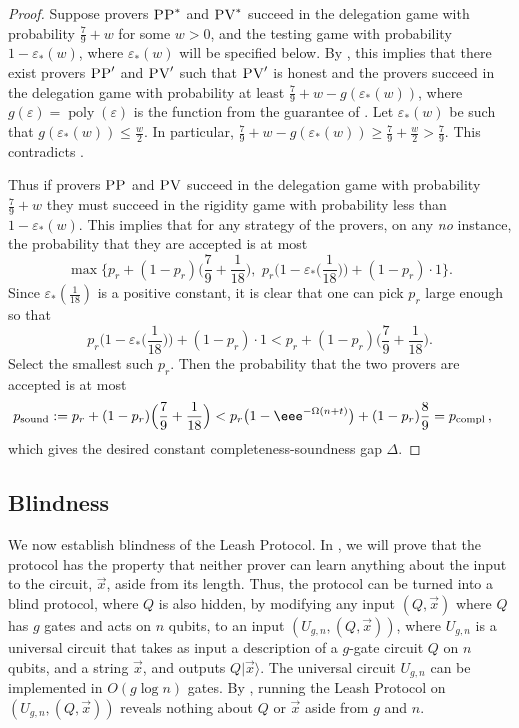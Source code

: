 \documentclass{toc}
\newcommand{\ket}[1]{|#1\rangle}
\DeclareMathOperator{\poly}{poly}
\DeclareMathOperator{\sound}{sound}
\DeclareMathOperator{\compl}{compl}
\newcommand{\eps}{\varepsilon}
\newcommand{\pv}{\textsc{PV}}
\newcommand{\pp}{\textsc{PP}}
\begin{document}
\begin{proof}
Suppose provers $\pp^*$ and $\pv^*$ succeed in the delegation game with probability $\frac79+w$ for some $w>0$, and the testing game with probability $1-\eps_*(w)$, where $\eps_*(w)$ will be specified below. By , this implies that there exist provers $\pp'$ and $\pv'$ such that $\pv'$ is honest and the provers succeed in the delegation game with probability at least $\frac79+w-g(\eps_*(w))$, where $g(\eps) = \poly(\eps)$ is the function from the guarantee of . Let $\eps_*(w)$ be such that $g(\eps_*(w)) \leq \frac{w}{2}$. In particular, $\frac79+w-g(\eps_*(w)) \geq \frac79+\frac{w}{2}>\frac79$. This contradicts . 

Thus if provers $\pp$ and $\pv$ succeed in the delegation game with probability $\frac79+w$ they must succeed in the rigidity game with probability less than $1-\eps_*(w)$. 
This implies that for any strategy of the provers, on any \textit{no} instance, the probability that they are accepted is at most
\begin{equation}
\max\Big\{p_r+(1-p_r)\Big(\frac79+\frac{1}{18}\Big),\,\, p_r\Big(1-\eps_*\Big(\frac{1}{18}\Big)\Big)+(1-p_r)\cdot 1\Big\}.
\end{equation}
Since $\eps_*(\frac{1}{18})$ is a positive constant, it is clear that one can pick $p_r$ large enough so that 
\begin{equation}
p_r\Big(1-\eps_*\Big(\frac{1}{18}\Big)\Big)+(1-p_r)\cdot 1 < p_r+(1-p_r)\Big(\frac79+\frac{1}{18}\Big).
\end{equation}
Select the smallest such $p_r$. Then the probability that the two provers are accepted is at most 
\begin{align*}
p_{\sound} &:= p_r+(1-p_r)\Big(\frac79+\frac{1}{18}\Big)
< p_r\big(1-\eee^{-\Omega(n+t)}\big)+(1-p_r)\frac89 
= p_{\compl} \,,
\end{align*}
which gives the desired constant completeness-soundness gap $\Delta$.
\end{proof}

\subsection{Blindness}
\label{sec:leash-blind}

We now establish blindness of the Leash Protocol. In , we will prove that the protocol has the property that neither prover can learn anything about the input to the circuit, $\vec{x}$, aside from its length. Thus, the protocol can be turned into a blind protocol, where $Q$ is also hidden, by modifying any input $(Q,\vec{x})$ where $Q$ has $g$ gates and acts on $n$ qubits, to an input $(U_{g,n},(Q,\vec{x}))$, where $U_{g,n}$ is a universal circuit that takes as input a description of a $g$-gate circuit $Q$ on $n$ qubits, and a string $\vec{x}$, and outputs $Q\ket{\vec{x}}$. The universal circuit $U_{g,n}$ can be implemented in $O(g\log n)$ gates. By , running the Leash Protocol on $(U_{g,n},(Q,\vec{x}))$ reveals nothing about $Q$ or $\vec{x}$ aside from $g$ and $n$.
\end{document}
